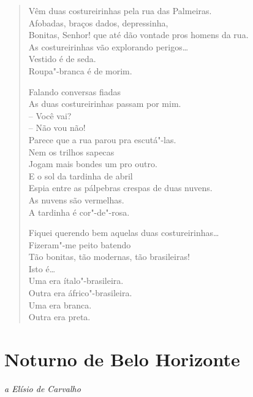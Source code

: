 \begin{verse}
Vêm duas costureirinhas pela rua das Palmeiras.\\
Afobadas, braços dados, depressinha,\\
Bonitas, Senhor! que até dão vontade pros homens da rua.\\
As costureirinhas vão explorando perigos\ldots{}\\
Vestido é de seda.\\
Roupa"-branca é de morim.

Falando conversas fiadas\\
As duas costureirinhas passam por mim.\\
-- Você vai?\\
\quad\quad{}-- Não vou não!\\
Parece que a rua parou pra escutá"-las.\\
Nem os trilhos sapecas\\
Jogam mais bondes um pro outro.\\
E o sol da tardinha de abril\\
Espia entre as pálpebras crespas de duas nuvens.\\
As nuvens são vermelhas.\\
A tardinha é cor"-de"-rosa.

Fiquei querendo bem aquelas duas costureirinhas\ldots{}\\
Fizeram"-me peito batendo\\
Tão bonitas, tão modernas, tão brasileiras!\\
Isto é\ldots{}\\
Uma era ítalo"-brasileira.\\
Outra era áfrico"-brasileira.\\
Uma era branca.\\
Outra era preta.
\end{verse}

\chapter[Noturno de Belo Horizonte]{Noturno de Belo Horizonte }

\begin{flushright}
\emph{a Elísio de Carvalho}
\end{flushright}

